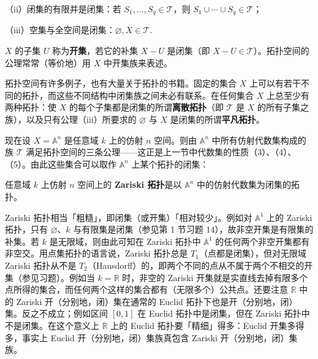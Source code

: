 （ii）闭集的有限并是闭集：若 \(S_1, \ldots, S_q \in \mathcal{T}\)，则 \(S_1 \cup \cdots \cup S_q \in \mathcal{T}\)；

（iii）空集与全空间是闭集：\(\varnothing, X \in \mathcal{T}\).

\(X\) 的子集 \(U\) 称为\textbf{开集}，若它的补集 \(X-U\) 是闭集（即 \(X-U \in \mathcal{T}\)）。拓扑空间的公理常常（等价地）用 \(X\) 中开集族来表述。

拓扑空间有许多例子，也有大量关于拓扑的书籍。固定的集合 \(X\) 上可以有若干不同的拓扑，而这些不同结构中闭集族之间未必有联系。在任何集合 \(X\) 上总至少有两种拓扑：使 \(X\) 的每个子集都是闭集的所谓\textbf{离散拓扑}（即 \(\mathcal{T}\) 是 \(X\) 的所有子集之族），以及只有公理（iii）所要求的 \(\varnothing\) 与 \(X\) 是闭集的所谓\textbf{平凡拓扑}。

现在设 \(X = \mathbb{A}^n\) 是任意域 \(k\) 上的仿射 \(n\) 空间。则由 \(\mathbb{A}^n\) 中所有仿射代数集构成的族 \(\mathcal{T}\) 满足拓扑空间的三条公理——这正是上一节中代数集的性质（3）、（4）、（5）。由此这些集合可以取作 \(\mathbb{A}^n\) 上某个拓扑的闭集：

\begin{definition}
任意域 \(k\) 上仿射 \(n\) 空间上的 \textbf{Zariski 拓扑}是以 \(\mathbb{A}^n\) 中的仿射代数集为闭集的拓扑。
\end{definition}

Zariski 拓扑相当「粗糙」，即闭集（或开集）「相对较少」。例如对 \(\mathbb{A}^1\) 上的 Zariski 拓扑，只有 \(\varnothing\)、\(k\) 与有限集是闭集（参见第 1 节习题 14），故非空开集是有限集的补集。若 \(k\) 是无限域，则由此可知在 Zariski 拓扑中 \(\mathbb{A}^1\) 的任何两个非空开集都有非空交。用点集拓扑的语言说，Zariski 拓扑总是 \(T_1\)（点都是闭集），但对无限域 Zariski 拓扑从不是 \(T_2\)（Hausdorff）的，即两个不同的点从不属于两个不相交的开集（参见习题）。例如当 \(k = \mathbb{R}\) 时，非空的 Zariski 开集就是实直线去掉有限多个点所得的集合，而任何两个这样的集合都有（无限多个）公共点。还要注意 \(\mathbb{R}\) 中的 Zariski 开（分别地，闭）集在通常的 Euclid 拓扑下也是开（分别地，闭）集。反之不成立；例如区间 \([0,1]\) 在 Euclid 拓扑中是闭集，但在 Zariski 拓扑中不是闭集。在这个意义上 \(\mathbb{R}\) 上的 Euclid 拓扑要「精细」得多：Euclid 开集多得多，事实上 Euclid 开（分别地，闭）集族真包含 Zariski 开（分别地，闭）集族。

